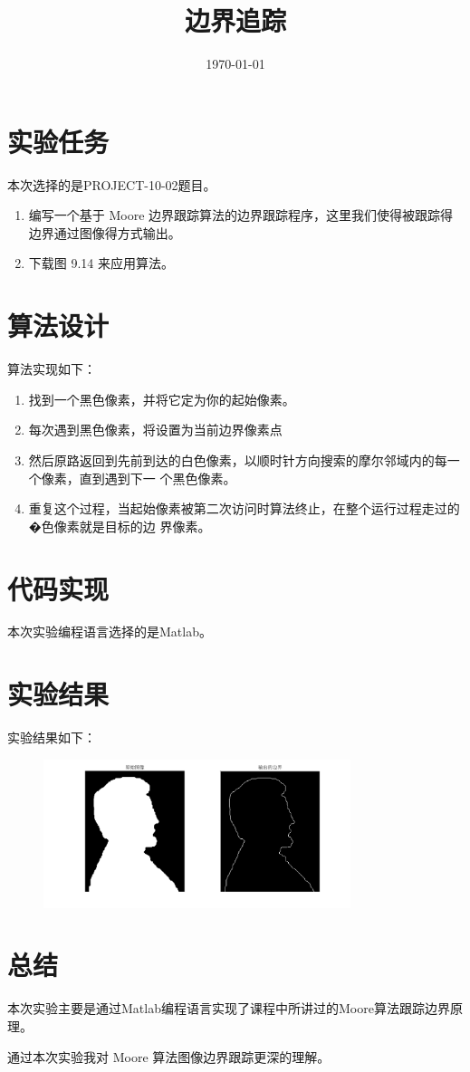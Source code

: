 \documentclass{../source/Experiment}
\title{边界追踪}
\date{\today}
\begin{document}
    \makecover
    \section{实验任务}

        本次选择的是PROJECT-10-02题目。

        \begin{enumerate}
            \item 编写一个基于 Moore 边界跟踪算法的边界跟踪程序，这里我们使得被跟踪得边界通过图像得方式输出。
            \item 下载图 9.14 来应用算法。
        \end{enumerate}

    \section{算法设计}
        算法实现如下：

        \begin{enumerate}
            \item 找到一个黑色像素，并将它定为你的起始像素。
            \item 每次遇到黑色像素，将设置为当前边界像素点
            \item 然后原路返回到先前到达的白色像素，以顺时针方向搜索的摩尔邻域内的每一个像素，直到遇到下一
            个黑色像素。
            \item 重复这个过程，当起始像素被第二次访问时算法终止，在整个运行过程走过的�色像素就是目标的边
            界像素。
        \end{enumerate}


    \section{代码实现}
        本次实验编程语言选择的是Matlab。

        

    \section{实验结果}
        实验结果如下：

        \begin{figure}[H]
            \centering
            \includegraphics[width = 0.8\textwidth]{第六次/untitled.png}
        \end{figure}


    \section{总结}
    本次实验主要是通过Matlab编程语言实现了课程中所讲过的Moore算法跟踪边界原理。

    通过本次实验我对 Moore 算法图像边界跟踪更深的理解。
\end{document}
